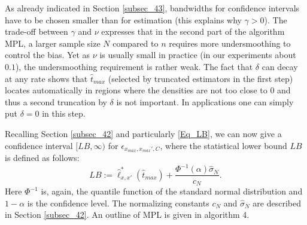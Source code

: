 \documentclass[conference]{IEEEtran}
\begin{document}
As already indicated in Section \ref{subsec_43}, bandwidths for confidence intervals have to be chosen smaller than for estimation (this explains why $\gamma>0$). The trade-off between $\gamma$ and $\nu$ expresses that in the second part of the algorithm MPL, a larger sample size $N$ compared to $n$ requires more undersmoothing to control the bias. Yet as $\nu$ is usually small  in practice (in our experiments about $0.1$), the undersmoothing requirement is rather weak. The fact that $\delta$ can decay at any rate shows that $\hat t_{max}$ (selected by truncated estimators in the first step) locates automatically in regions where the densities are not too close to $0$ and thus a second truncation by $\delta$ is not important. In applications one can simply put $\delta = 0$ in this step.

Recalling Section \ref{subsec_42} and particularly \eqref{Eq_LB}, we can now give a confidence interval $[LB, \infty)$ for $ \epsilon_{x_{max}, x_{max}',C}$, where the statistical lower bound $LB$ is defined as follows: 
\begin{equation} \label{Eq_def_LB}
LB := \hat \ell_{x,x'}^*(\hat t_{max})+\frac{\Phi^{-1}(\alpha) \hat \sigma_N}{c_N}.
\end{equation}
Here $\Phi^{-1}$ is, again, the quantile function of the standard normal distribution and $1-\alpha$ is the confidence level. The normalizing constants $c_N$ and $\hat \sigma_N$ are described in Section \ref{subsec_42}. An outline of MPL is given in algorithm 4.
\end{document}
